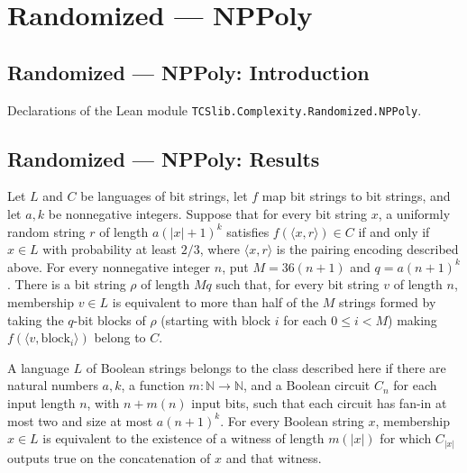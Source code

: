 \section{Randomized --- NPPoly}
\subsection*{Randomized --- NPPoly: Introduction}

Declarations of the Lean module \texttt{TCSlib.Complexity.Randomized.NPPoly}.

\subsection*{Randomized --- NPPoly: Results}

\begin{theorem}
\label{Randomized.exists_good_coins}
\leanok
{}
Let $L$ and $C$ be languages of bit strings, let $f$ map bit strings to bit strings, and
let $a,k$ be nonnegative integers. Suppose that for every bit string $x$, a uniformly
random string $r$ of length $a(|x|+1)^k$ satisfies $f(\langle x,r\rangle)\in C$ if and
only if $x\in L$ with probability at least $2/3$, where $\langle x,r\rangle$ is the
pairing encoding described above. For every nonnegative integer $n$, put $M=36(n+1)$ and
$q=a(n+1)^k$. There is a bit string $\rho$ of length $Mq$ such that, for every bit
string $v$ of length $n$, membership $v\in L$ is equivalent to more than half of the $M$
strings formed by taking the $q$-bit blocks of $\rho$ (starting with block $i$ for each
$0\le i<M$) making $f(\langle v,\text{block}_i\rangle)$ belong to $C$.
\end{theorem}

\begin{definition}
\label{Language.InNPPoly}
\leanok
{}
A language $L$ of Boolean strings belongs to the class described here if there are
natural numbers $a,k$, a function $m:\mathbb{N}\to\mathbb{N}$, and a Boolean circuit
$C_n$ for each input length $n$, with $n+m(n)$ input bits, such that each circuit has
fan-in at most two and size at most $a(n+1)^k$. For every Boolean string $x$, membership
$x\in L$ is equivalent to the existence of a witness of length $m(|x|)$ for which
$C_{|x|}$ outputs true on the concatenation of $x$ and that witness.
\end{definition}

